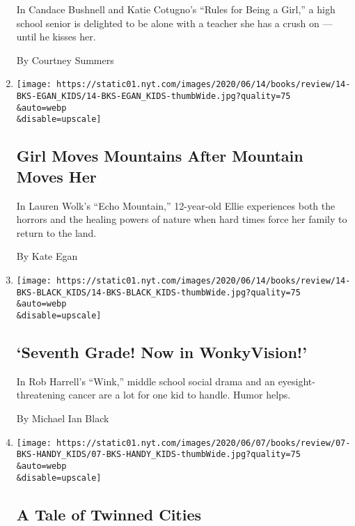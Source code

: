 \begin{enumerate}
  In Candace Bushnell and Katie Cotugno's ``Rules for Being a Girl,'' a
  high school senior is delighted to be alone with a teacher she has a
  crush on --- until he kisses her.

  By Courtney Summers
\item
  \href{/2020/06/06/books/review/lauren-wolk-echo-mountain.html}{}

  \texttt{[image: https://static01.nyt.com/images/2020/06/14/books/review/14-BKS-EGAN\_KIDS/14-BKS-EGAN\_KIDS-thumbWide.jpg?quality=75\\\&auto=webp\\\&disable=upscale]}

  \hypertarget{girl-moves-mountains-after-mountain-moves-her}{%
  \subsection{Girl Moves Mountains After Mountain Moves
  Her}\label{girl-moves-mountains-after-mountain-moves-her}}

  In Lauren Wolk's ``Echo Mountain,'' 12-year-old Ellie experiences both
  the horrors and the healing powers of nature when hard times force her
  family to return to the land.

  By Kate Egan
\item
  \href{/2020/06/06/books/review/wink-rob-harrell.html}{}

  \texttt{[image: https://static01.nyt.com/images/2020/06/14/books/review/14-BKS-BLACK\_KIDS/14-BKS-BLACK\_KIDS-thumbWide.jpg?quality=75\\\&auto=webp\\\&disable=upscale]}

  \hypertarget{seventh-grade-now-in-wonkyvision}{%
  \subsection{`Seventh Grade! Now in
  WonkyVision!'}\label{seventh-grade-now-in-wonkyvision}}

  In Rob Harrell's ``Wink,'' middle school social drama and an
  eyesight-threatening cancer are a lot for one kid to handle. Humor
  helps.

  By Michael Ian Black
\item
  \href{/2020/05/30/books/review/thieves-of-weirdwood-christian-mckay-heidicker.html}{}

  \texttt{[image: https://static01.nyt.com/images/2020/06/07/books/review/07-BKS-HANDY\_KIDS/07-BKS-HANDY\_KIDS-thumbWide.jpg?quality=75\\\&auto=webp\\\&disable=upscale]}

  \hypertarget{a-tale-of-twinned-cities}{%
  \subsection{A Tale of Twinned Cities}\label{a-tale-of-twinned-cities}}


\end{enumerate}
